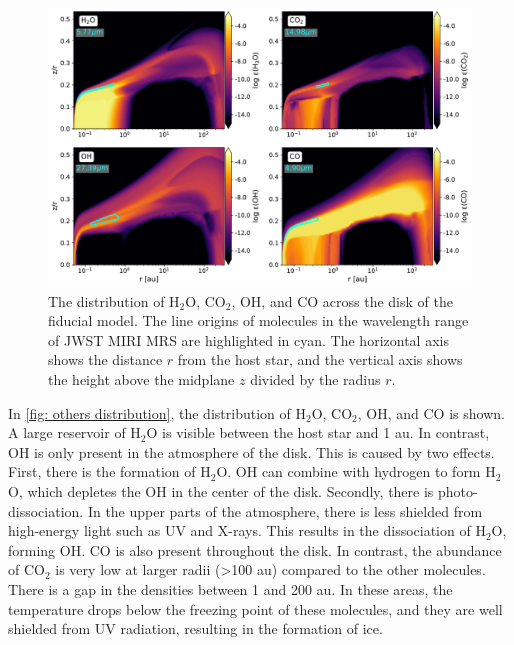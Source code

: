 \documentclass[twoside, single, authoryear, semicolon, 12pt]{lion-msc}
\newcommand{\4}{$_4$}
\newcommand{\3}{$_3$}
\newcommand{\2}{$_2$}
\begin{document}
\begin{figure}[H]
    \centering
    \includegraphics[width=\linewidth]{Figures/Abundance1.pdf}
    \caption{The distribution of H\2O, CO\2, OH, and CO across the disk of the fiducial model. The line origins of molecules in the wavelength range of JWST MIRI MRS are highlighted in cyan. The horizontal axis shows the distance $r$ from the host star, and the vertical axis shows the height above the midplane $z$ divided by the radius $r$.}
    \label{fig: others distribution}
\end{figure}
In \autoref{fig: others distribution}, the distribution of H\2O, CO\2, OH, and CO is shown. A large reservoir of H\2O is visible between the host star and 1 au. In contrast, OH is only present in the atmosphere of the disk. This is caused by two effects. First, there is the formation of H\2O. OH can combine with hydrogen to form H\2O, which depletes the OH in the center of the disk. Secondly, there is photo-dissociation. In the upper parts of the atmosphere, there is less shielded from high-energy light such as UV and X-rays. This results in the dissociation of H\2O, forming OH. CO is also present throughout the disk. In contrast, the abundance of CO\2 is very low at larger radii (\textgreater 100 au) compared to the other molecules. There is a gap in the densities between 1 and 200 au. In these areas, the temperature drops below the freezing point of these molecules, and they are well shielded from UV radiation, resulting in the formation of ice. 
\end{document}
